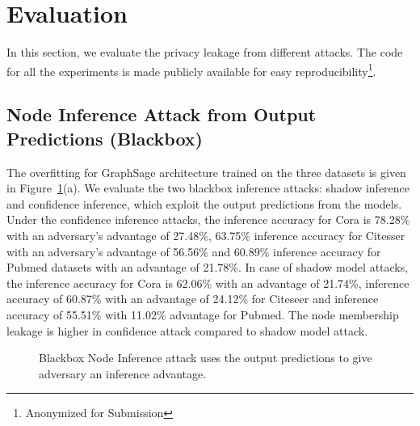\section{Evaluation}\label{evaluation}

In this section, we evaluate the privacy leakage from different attacks.
The code for all the experiments is made publicly available for easy reproducibility\footnote{Anonymized for Submission}.

\subsection{Node Inference Attack from Output Predictions (Blackbox)}


The overfitting for GraphSage architecture trained on the three datasets is given in Figure~\ref{fig:NIA}(a).
We evaluate the two blackbox inference attacks: shadow inference and confidence inference, which exploit the output predictions from the models.
Under the confidence inference attacks, the inference accuracy for Cora is 78.28\% with an adversary's advantage of 27.48\%, 63.75\% inference accuracy for Citesser with an adversary's advantage of 56.56\% and 60.89\% inference accuracy for Pubmed datasets with an advantage of 21.78\%.
In case of shadow model attacks, the inference accuracy for Cora is 62.06\% with an advantage of 21.74\%, inference accuracy of 60.87\% with an advantage of 24.12\% for Citeseer and inference accuracy of 55.51\% with 11.02\% advantage for Pubmed.
The node membership leakage is higher in confidence attack compared to shadow model attack.


\begin{figure}[!htb]
    \centering
    \begin{minipage}[b]{1\linewidth}
    \centering
    \end{minipage}
    \caption{Blackbox Node Inference attack uses the output predictions to give adversary an inference advantage.}
    \label{fig:NIA}
\end{figure}



